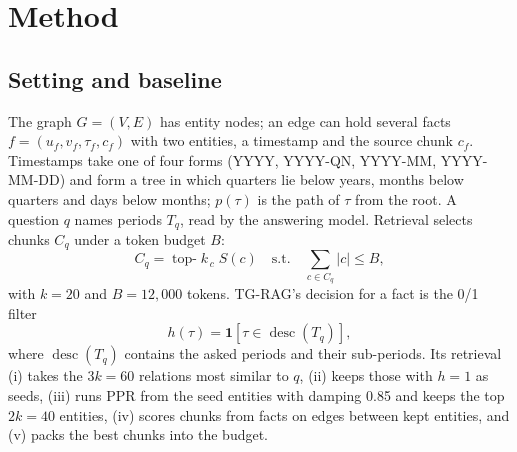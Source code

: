\section{Method}
\subsection{Setting and baseline}
The graph $G = (V, E)$ has entity nodes; an edge can hold several facts $f = (u_f, v_f, \tau_f, c_f)$ with two entities, a timestamp and the source chunk $c_f$. Timestamps take one of four forms (YYYY, YYYY-QN, YYYY-MM, YYYY-MM-DD) and form a tree in which quarters lie below years, months below quarters and days below months; $p(\tau)$ is the path of $\tau$ from the root. A question $q$ names periods $T_q$, read by the answering model. Retrieval selects chunks $C_q$ under a token budget $B$:
\begin{equation}
  C_q = \operatorname{top\text{-}}k_{\,c}\; S(c) \quad \text{s.t.} \quad \textstyle\sum_{c \in C_q} |c| \le B,
  \label{eq:select}
\end{equation}
with $k = 20$ and $B = 12{,}000$ tokens. TG-RAG's decision for a fact is the 0/1 filter
\begin{equation}
  h(\tau) = \mathbf{1}\!\left[\tau \in \operatorname{desc}(T_q)\right],
  \label{eq:hard}
\end{equation}
where $\operatorname{desc}(T_q)$ contains the asked periods and their sub-periods. Its retrieval (i) takes the $3k = 60$ relations most similar to $q$, (ii) keeps those with $h = 1$ as seeds, (iii) runs PPR from the seed entities with damping 0.85 and keeps the top $2k = 40$ entities, (iv) scores chunks from facts on edges between kept entities, and (v) packs the best chunks into the budget.

